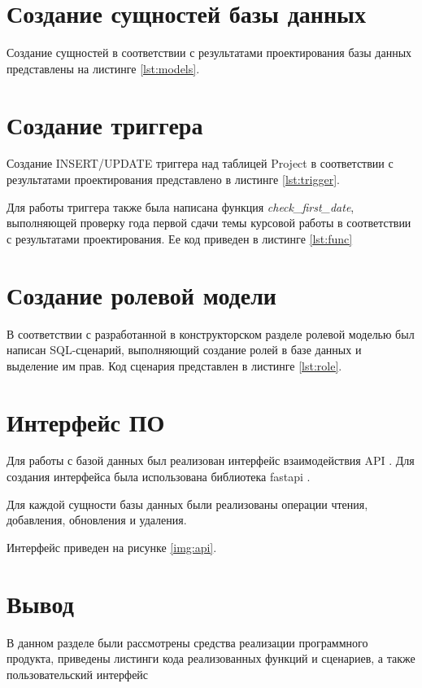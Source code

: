 \section{Создание сущностей базы данных}

Создание сущностей в соответствии с результатами проектирования базы данных представлены на листинге \ref{lst:models}.


\section{Создание триггера}

Создание INSERT/UPDATE триггера над таблицей Project в соответствии с результатами проектирования представлено в листинге \ref{lst:trigger}.


Для работы триггера также была написана функция \textit{check\_first\_date}, выполняющей проверку года первой сдачи темы курсовой работы в соответствии с результатами проектирования. Ее код приведен в листинге \ref{lst:func}


\section{Создание ролевой модели}

В соответствии с разработанной в конструкторском разделе ролевой моделью был написан SQL-сценарий, выполняющий создание ролей в базе данных и выделение им прав. Код сценария представлен в листинге \ref{lst:role}.


\section{Интерфейс ПО}

Для работы с базой данных был реализован интерфейс взаимодействия API \cite{API}. Для создания интерфейса была использована библиотека fastapi \cite{fastapi}.

Для каждой сущности базы данных были реализованы операции чтения, добавления, обновления и удаления.

Интерфейс приведен на рисунке \ref{img:api}.


\section*{Вывод}
В данном разделе были рассмотрены средства реализации программного продукта, приведены листинги кода реализованных функций и сценариев, а также пользовательский интерфейс